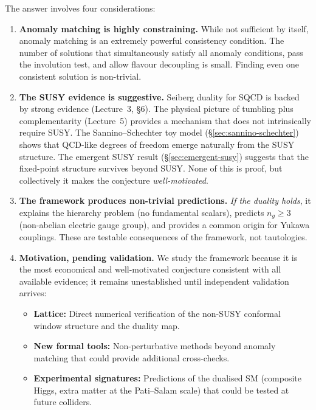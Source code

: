 \documentclass[11pt,a4paper]{article}
\begin{document}
The answer involves four considerations:

\begin{enumerate}[label=(\alph*)]
  \item \textbf{Anomaly matching is highly constraining.}  While not
    sufficient by itself, anomaly matching is an extremely powerful
    consistency condition.  The number of solutions that simultaneously
    satisfy all anomaly conditions, pass the involution test, and allow
    flavour decoupling is small.  Finding even one consistent solution
    is non-trivial.

  \item \textbf{The SUSY evidence is suggestive.}  Seiberg duality
    for SQCD is backed by strong evidence (Lecture~3, \S6).  The physical
    picture of tumbling plus
    complementarity (Lecture~5) provides a mechanism that does not
    intrinsically require SUSY.  The Sannino--Schechter toy model
    (\S\ref{sec:sannino-schechter}) shows that QCD-like degrees of
    freedom emerge naturally from the SUSY structure.  The emergent
    SUSY result (\S\ref{sec:emergent-susy}) suggests that the
    fixed-point structure survives beyond SUSY.  None of this is proof,
    but collectively it makes the conjecture \emph{well-motivated}.

  \item \textbf{The framework produces non-trivial predictions.}
    \emph{If the duality holds}, it explains the hierarchy problem
    (no fundamental scalars), predicts $n_g \geq 3$ (non-abelian
    electric gauge group), and provides a common origin for Yukawa
    couplings.  These are testable consequences of the framework,
    not tautologies.

  \item \textbf{Motivation, pending validation.}  We study the
    framework because it is the most economical and well-motivated
    conjecture consistent with all available evidence; it remains
    unestablished until independent validation arrives:
    \begin{itemize}
      \item \textbf{Lattice:} Direct numerical verification of the
        non-SUSY conformal window structure and the duality map.
      \item \textbf{New formal tools:} Non-perturbative methods
        beyond anomaly matching that could provide additional
        cross-checks.
      \item \textbf{Experimental signatures:} Predictions of the
        dualised SM (composite Higgs, extra matter at the
        Pati--Salam scale) that could be tested at future colliders.
    \end{itemize}
\end{enumerate}
\end{document}
